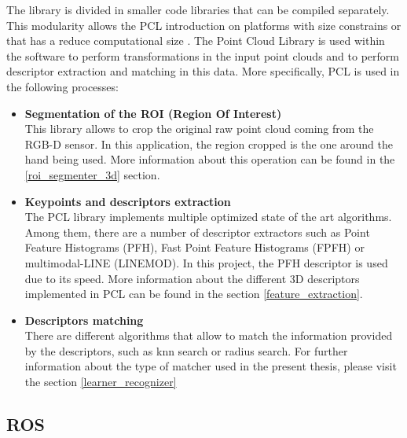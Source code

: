 		The library is divided in smaller code libraries that can be compiled separately. This modularity allows the PCL introduction on platforms with size constrains or that has a reduce computational size \cite{Rusu_ICRA2011_PCL}.
		The Point Cloud Library is used within the software to perform transformations in the input point clouds and to perform descriptor extraction and matching in this data. 
		More specifically, PCL is used in the following processes: 

		\begin{itemize}
			\item{\textbf{Segmentation of the ROI (Region Of Interest)\\ }}
			This library allows to crop the original raw point cloud coming from the RGB-D sensor. In this application, the region cropped is the one around the hand being used. More information about this operation can be found in the \ref{roi_segmenter_3d} section. 
			

			\item{\textbf{ Keypoints and descriptors extraction\\ }}
			 The PCL library implements multiple optimized state of the art algorithms. Among them, there are a number of descriptor extractors such as Point Feature Histograms (PFH), Fast Point Feature Histograms (FPFH) or multimodal-LINE (LINEMOD). In this project, the PFH descriptor is used due to its speed. More information about the different 3D descriptors implemented in PCL can be found in the section  \ref{feature_extraction}.


			\item {\textbf{Descriptors matching\\ }}
			There are different algorithms that allow to match the information provided by the descriptors, such as knn search or radius search. For further information about the type of matcher used in the present thesis, please visit the section \ref{learner_recognizer}
		\end{itemize}






	\subsection{ROS}
		\label{ros}

